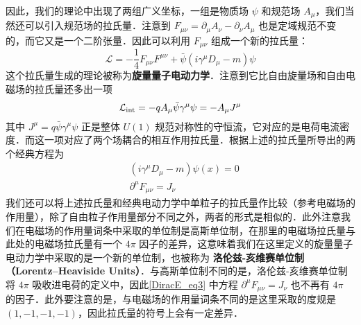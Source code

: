 因此，我们的理论中出现了两组广义坐标，一组是物质场 $\psi$ 和规范场 $A_\mu$，我们当然还可以引入规范场的拉氏量．注意到 $F_{\mu\nu} = \partial_\mu A_\nu - \partial_\nu A_\mu$ 也是定域规范不变的，而它又是一个二阶张量．因此可以利用 $F_{\mu\nu}$ 组成一个新的拉氏量：
\begin{equation}
\mathcal{L}=-\frac{1}{4}F_{\mu\nu}F^{\mu\nu} + \bar\psi (i\gamma^\mu D_\mu - m)\psi
\end{equation}
这个拉氏量生成的理论被称为\textbf{旋量量子电动力学}．注意到它比自由旋量场和自由电磁场的拉氏量还多出一项
\begin{equation}
\mathcal{L}_{\rm int}=-q A_\mu \bar\psi \gamma^\mu \psi=-A_\mu J^\mu
\end{equation}
其中 $J^\mu = q\bar\psi \gamma^\mu \psi$ 正是整体 $U(1)$ 规范对称性的守恒流，它对应的是电荷电流密度．而这一项对应了两个场耦合的相互作用拉氏量．根据上述的拉氏量所导出的两个经典方程为
\begin{equation}\label{DiracE_eq3}
\begin{aligned}
&(i\gamma^\mu D_\mu - m)\psi(x)=0\\
&\partial^\mu F_{\mu\nu}=J_\nu
\end{aligned}
\end{equation}
我们还可以将上述拉氏量和经典电动力学中单粒子的拉氏量作比较（参考电磁场的作用量），除了自由粒子作用量部分不同之外，两者的形式是相似的．此外注意我们在电磁场的作用量词条中采取的单位制是高斯单位制，在那里的电磁场拉氏量与此处的电磁场拉氏量有一个 $4\pi$ 因子的差异，这意味着我们在这里定义的旋量量子电动力学中采取的是一个新的单位制，也被称为 \textbf{洛伦兹-亥维赛单位制 （Lorentz–Heaviside Units）}．与高斯单位制不同的是，洛伦兹-亥维赛单位制将 $4\pi$ 吸收进电荷的定义中，因此\autoref{DiracE_eq3} 中方程 $\partial^\mu F_{\mu\nu}=J_\nu$ 也不再有 $4\pi$ 的因子．此外要注意的是，与电磁场的作用量词条不同的是这里采取的度规是 $(1,-1,-1,-1)$，因此拉氏量的符号上会有一定差异．
